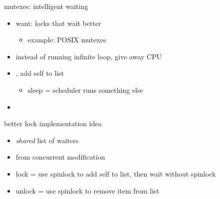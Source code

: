 \begin{frame}{mutexes: intelligent waiting}
\begin{itemize}
    \item want: locks that wait better 
        \begin{itemize}
        \item example: POSIX mutexes
        \end{itemize}
    \item instead of running infinite loop, give away CPU
    \vspace{.5cm}
    \item {}, add self to list
        \begin{itemize}
            \item sleep = scheduler runs something else
        \end{itemize}
    \item {}
\end{itemize}
\end{frame}

\begin{frame}{better lock implementation idea}
\begin{itemize}
    \item \textit{shared} list of waiters
    \item {} from concurrent modification
    \vspace{.5cm}
    \item lock = use spinlock to add self to list, then wait without spinlock
    \item unlock = use spinlock to remove item from list
\end{itemize}
\end{frame}

